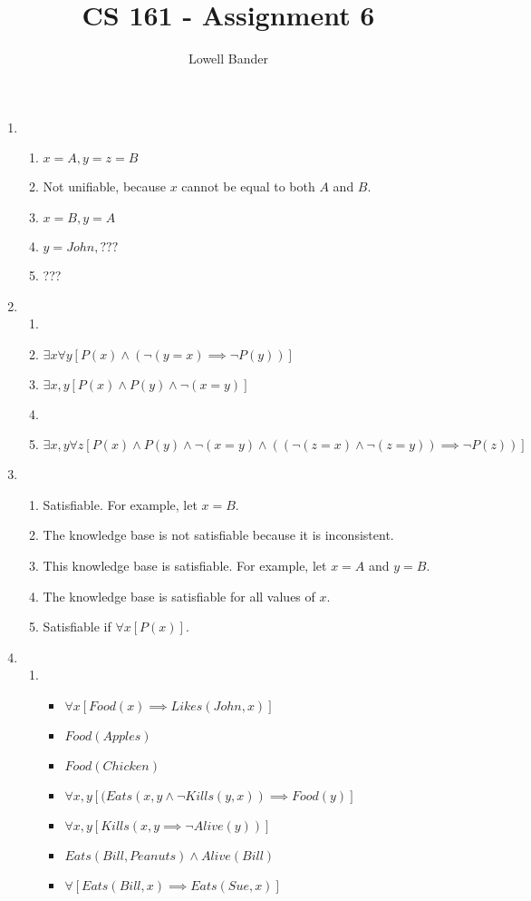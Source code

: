 \documentclass[]{article}
\begin{document}
\title{CS 161 - Assignment 6}
\author{Lowell Bander}
\maketitle

\begin{enumerate}
\item \begin{enumerate}
\item $x = A, y = z = B$
\item Not unifiable, because $x$ cannot be equal to both $A$ and $B$.
\item $x = B, y = A$
\item $y = John, ???$
\item ???
\end{enumerate}

\item \begin{enumerate}
\item 
\item $\exists x \forall y [P(x) \land (\neg(y=x) \implies \neg P(y))]$
\item $\exists x,y [P(x) \land P(y) \land \neg(x = y)]$
\item 
\item $\exists x,y \forall z [P(x) \land P(y) \land \neg(x = y)\land ((\neg(z = x) \land \neg(z = y)) \implies \neg P(z))]$
\end{enumerate}

\item \begin{enumerate}
\item Satisfiable. For example, let $x = B$.
\item The knowledge base is not satisfiable because it is inconsistent.
\item This knowledge base is satisfiable. For example, let $x = A$ and $y = B$.
\item The knowledge base is satisfiable for all values of $x$.
\item Satisfiable if $\forall x [P(x)]$.
\end{enumerate}


\item \begin{enumerate}
\item \begin{itemize}
\item $\forall x [Food(x) \implies Likes(John, x)]$
\item $Food(Apples)$
\item $Food(Chicken)$
\item $\forall x,y [(Eats(x,y \land \neg Kills(y,x)) \implies Food(y)]$
\item $\forall x,y [Kills(x,y \implies \neg Alive(y))]$
\item $Eats(Bill, Peanuts) \land Alive(Bill)$
\item $\forall [Eats(Bill, x) \implies Eats(Sue, x)]$
\end{itemize}
\end{enumerate}

\end{enumerate}
\end{document}
